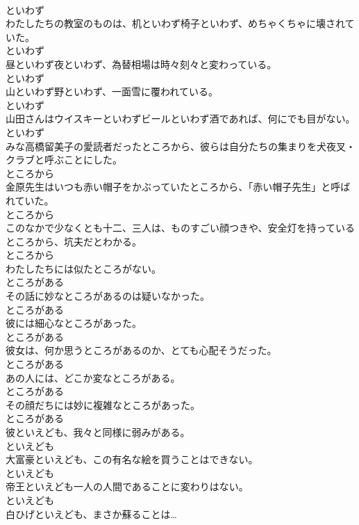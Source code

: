 \documentclass[8pt]{extreport}
\begin{document}
\begin{CJK}{UTF8}{min}
\\	といわず
\\	わたしたちの教室のものは、机といわず椅子といわず、めちゃくちゃに壊されていた。	
\\	といわず
\\	昼といわず夜といわず、為替相場は時々刻々と変わっている。	
\\	といわず
\\	山といわず野といわず、一面雪に覆われている。	
\\	といわず
\\	山田さんはウイスキーといわずビールといわず酒であれば、何にでも目がない。	
\\	といわず
\\	みな高橋留美子の愛読者だったところから、彼らは自分たちの集まりを犬夜叉・クラブと呼ぶことにした。	
\\	ところから
\\	金原先生はいつも赤い帽子をかぶっていたところから、「赤い帽子先生」と呼ばれていた。	
\\	ところから
\\	このなかで少なくとも十二、三人は、ものすごい顔つきや、安全灯を持っているところから、坑夫だとわかる。	
\\	ところから
\\	わたしたちには似たところがない。	
\\	ところがある
\\	その話に妙なところがあるのは疑いなかった。	
\\	ところがある
\\	彼には細心なところがあった。	
\\	ところがある
\\	彼女は、何か思うところがあるのか、とても心配そうだった。	
\\	ところがある
\\	あの人には、どこか変なところがある。	
\\	ところがある
\\	その顔だちには妙に複雑なところがあった。	
\\	ところがある
\\	彼といえども、我々と同様に弱みがある。	
\\	といえども
\\	大富豪といえども、この有名な絵を買うことはできない。	
\\	といえども
\\	帝王といえども一人の人間であることに変わりはない。	
\\	といえども
\\	白ひげといえども、まさか蘇ることは…	

\end{CJK}
\end{document}
